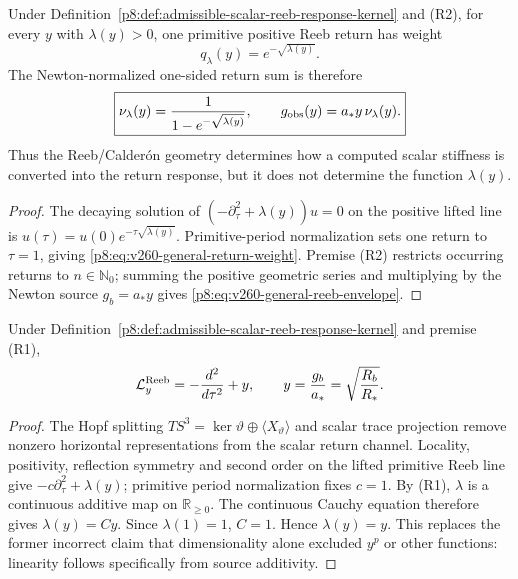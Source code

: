 \documentclass[12pt,a4paper]{article}
\begin{document}
\begin{proposition}
\label{p8:prop:v260-general-reeb-envelope}
Under Definition~\ref{p8:def:admissible-scalar-reeb-response-kernel} and (R2),
for every \(y\) with \(\lambda(y)>0\), one primitive positive Reeb return has
weight
\begin{equation}
 \label{p8:eq:v260-general-return-weight}
 \boxed{q_\lambda(y)=e^{-\sqrt{\lambda(y)}}.}
\end{equation}
The Newton-normalized one-sided return sum is therefore
\begin{equation}
 \label{p8:eq:v260-general-reeb-envelope}
 \boxed{\nu_\lambda(y)=\frac{1}{1-e^{-\sqrt{\lambda(y)}}},\qquad
 g_{\rm obs}(y)=a_*y\,\nu_\lambda(y).}
\end{equation}
Thus the Reeb/Calder\'on geometry determines how a computed scalar stiffness
is converted into the return response, but it does not determine the function
\(\lambda(y)\).
\end{proposition}

\begin{proof}
The decaying solution of
\((-\partial_\tau^2+\lambda(y))u=0\) on the positive lifted line is
\(u(\tau)=u(0)e^{-\tau\sqrt{\lambda(y)}}\).  Primitive-period normalization
sets one return to \(\tau=1\), giving
\eqref{p8:eq:v260-general-return-weight}.  Premise (R2) restricts occurring
returns to \(n\in\mathbb N_0\); summing the positive geometric series and
multiplying by the Newton source \(g_b=a_*y\) gives
\eqref{p8:eq:v260-general-reeb-envelope}.
\end{proof}


\begin{lemma}
\label{p8:lem:static-reeb-normal-operator}
Under Definition~\ref{p8:def:admissible-scalar-reeb-response-kernel} and premise (R1),
\begin{equation}
\label{p8:eq:static-reeb-normal-operator-derived}
\mathcal L_y^{\rm Reeb}=-\frac{d^2}{d\tau^2}+y,
\qquad
y=\frac{g_b}{a_*}=\sqrt{\frac{R_b}{R_*}}.
\end{equation}
\end{lemma}

\begin{proof}
The Hopf splitting $TS^3=\ker\vartheta\oplus\langle X_\vartheta\rangle$ and scalar trace projection remove nonzero horizontal representations from the scalar return channel.  Locality, positivity, reflection symmetry and second order on the lifted primitive Reeb line give $-c\partial_\tau^2+\lambda(y)$; primitive period normalization fixes $c=1$.  By (R1), $\lambda$ is a continuous additive map on $\mathbb R_{\ge0}$.  The continuous Cauchy equation therefore gives $\lambda(y)=Cy$.  Since $\lambda(1)=1$, $C=1$.  Hence $\lambda(y)=y$.  This replaces the former incorrect claim that dimensionality alone excluded $y^p$ or other functions: linearity follows specifically from source additivity.
\end{proof}
\end{document}
